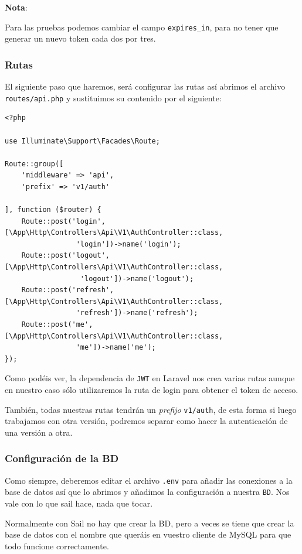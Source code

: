 \documentclass[11pt]{article}
\begin{document}
\textbf{Nota}:
\begin{mdframed}
Para las pruebas podemos cambiar el campo \texttt{expires\_in}, para no tener
que generar un nuevo token cada dos por tres.
\end{mdframed}

\subsubsection{Rutas}
\label{sec:org89d6ead}
El siguiente paso que haremos, será configurar las rutas así abrimos
el archivo \texttt{routes/api.php} y sustituimos su contenido por el siguiente:
\begin{verbatim}
<?php

use Illuminate\Support\Facades\Route;

Route::group([
    'middleware' => 'api',
    'prefix' => 'v1/auth'

], function ($router) {
    Route::post('login', [\App\Http\Controllers\Api\V1\AuthController::class,
                 'login'])->name('login');
    Route::post('logout', [\App\Http\Controllers\Api\V1\AuthController::class,
                  'logout'])->name('logout');
    Route::post('refresh', [\App\Http\Controllers\Api\V1\AuthController::class,
                 'refresh'])->name('refresh');
    Route::post('me', [\App\Http\Controllers\Api\V1\AuthController::class,
                 'me'])->name('me');
});
\end{verbatim}


Como podéis ver, la dependencia de \texttt{JWT} en Laravel nos crea varias
rutas aunque en nuestro caso sólo utilizaremos la ruta de login para
obtener el token de acceso.

También, todas nuestras rutas tendrán un \emph{prefijo} \texttt{v1/auth}, de esta
forma si luego trabajamos con otra versión, podremos separar como
hacer la autenticación de una versión a otra.

\subsubsection{Configuración de la BD}
\label{sec:orgc6d02fc}
Como siempre, deberemos editar el archivo \texttt{.env} para añadir las
conexiones a la base de datos así que lo abrimos y añadimos la
configuración a nuestra \texttt{BD}. Nos vale con lo que sail hace, nada que
tocar.

Normalmente con Sail no hay que crear la BD, pero a veces se tiene que
crear la base de datos con el nombre que queráis en vuestro cliente de
MySQL para que todo funcione correctamente.
\end{document}
